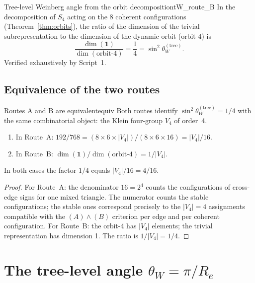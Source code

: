 \documentclass[11pt,a4paper]{article}
\newcommand{\Retot}{R_e}
\newcommand{\sinW}{\sin^2\!\theta_W}
\newcommand{\thetaW}{\theta_W}
\begin{document}
\begin{theorembox}{Tree-level Weinberg angle from the orbit decomposition}{tW_route_B}
In the decomposition of $S_4$ acting on the 8 coherent configurations (Theorem~\ref{thm:orbits}), the ratio of the dimension of the trivial subrepresentation to the dimension of the dynamic orbit (orbit-4) is
\begin{equation}
\frac{\dim(\mathbf{1})}{\dim(\text{orbit-4})} = \frac{1}{4} = \sinW^{(\mathrm{tree})}.
\label{eq:routeB}
\end{equation}
Verified exhaustively by Script~1.
\end{theorembox}

\subsection{Equivalence of the two routes}
\label{subsec:equiv}

\begin{theorembox}{Routes A and B are equivalent}{equiv}
Both routes identify $\sinW^{(\mathrm{tree})} = 1/4$ with the same combinatorial object: the Klein four-group $V_4$ of order~4.
\begin{enumerate}[label=(\roman*)]
\item In Route~A: $192 / 768 = (8 \times 6 \times |V_4|) / (8 \times 6 \times 16) = |V_4|/16$.
\item In Route~B: $\dim(\mathbf{1}) / \dim(\mathrm{orbit\text{-}4}) = 1/|V_4|$.
\end{enumerate}
In both cases the factor $1/4$ equals $|V_4|/16 = 4/16$.
\end{theorembox}

\begin{proof}
For Route~A: the denominator $16 = 2^4$ counts the configurations of cross-edge signs for one mixed triangle. The numerator counts the stable configurations; the stable ones correspond precisely to the $|V_4| = 4$ assignments compatible with the $(A)\wedge(B)$ criterion per edge and per coherent configuration. For Route~B: the orbit-4 has $|V_4|$ elements; the trivial representation has dimension 1. The ratio is $1/|V_4| = 1/4$.
\end{proof}

\section{The tree-level angle \texorpdfstring{$\thetaW = \pi/\Retot$}{theta\_W = pi/R\_e}}
\label{sec:tree_angle}
\end{document}
